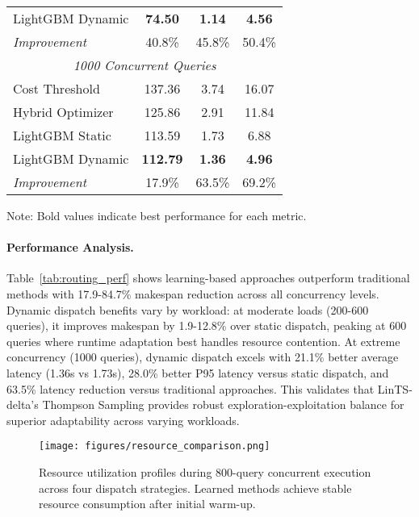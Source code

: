 \documentclass[sigconf, nonacm]{acmart}
\begin{document}
\begin{table}[t]
{\begin{tabular}{@{}lccc@{}}
LightGBM Dynamic   & \textbf{74.50}    & \textbf{1.14}   & \textbf{4.56}   \\
\hdashline
\textit{Improvement} & 40.8\% & 45.8\% & 50.4\% \\
\midrule
\multicolumn{4}{c}{\textit{1000 Concurrent Queries}} \\
\midrule
Cost Threshold     & 137.36   & 3.74   & 16.07   \\
Hybrid Optimizer   & 125.86   & 2.91   & 11.84   \\
LightGBM Static    & 113.59   & 1.73   & 6.88   \\
LightGBM Dynamic   & \textbf{112.79}   & \textbf{1.36}   & \textbf{4.96}   \\
\hdashline
\textit{Improvement} & 17.9\% & 63.5\% & 69.2\% \\
\bottomrule
\end{tabular}%
}
\footnotesize{Note: Bold values indicate best performance for each metric.}
\end{table}


\vspace{-0.9em}
\paragraph{Performance Analysis.}
Table~\ref{tab:routing_perf} shows learning-based approaches outperform traditional methods with 17.9-84.7\% makespan reduction across all concurrency levels. Dynamic dispatch benefits vary by workload: at moderate loads (200-600 queries), it improves makespan by 1.9-12.8\% over static dispatch, peaking at 600 queries where runtime adaptation best handles resource contention. At extreme concurrency (1000 queries), dynamic dispatch excels with 21.1\% better average latency (1.36s vs 1.73s), 28.0\% better P95 latency versus static dispatch, and 63.5\% latency reduction versus traditional approaches. This validates that LinTS-delta's Thompson Sampling provides robust exploration-exploitation balance for superior adaptability across varying workloads.

\begin{figure*}[t]
    \centering
    \texttt{[image: figures/resource\_comparison.png]}
    \caption{Resource utilization profiles during 800-query concurrent execution across four dispatch strategies. Learned methods achieve stable resource consumption after initial warm-up.}
    \label{fig:resource-comparison}
\end{figure*}

\vspace{-0.5em}
\end{document}
